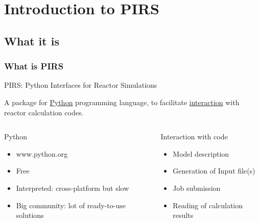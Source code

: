 
\section{Introduction to PIRS}
\subsection{What it is}
\begin{frame}\frametitle{What is PIRS}

    \begin{block}{PIRS: Python Interfaces for Reactor Simulations}

        A package for \uline{Python} programming language, to facilitate
        \uline{interaction} with reactor calculation codes.
    \end{block}

    \begin{columns}

        \pause
        \begin{block}{Python}
        \begin{itemize}

            \item www.python.org

            \item Free 

            \item Interpreted: cross-platform but slow

            \item Big community: lot of ready-to-use solutions


        \end{itemize}
        \end{block}


        \pause
        \begin{block}{Interaction with code}
        \begin{itemize}
            
            \item Model description

            \item Generation of Input file(s)

            \item Job submission

            \item Reading of calculation results

        \end{itemize}
        \end{block}
    \end{columns}
\end{frame}

